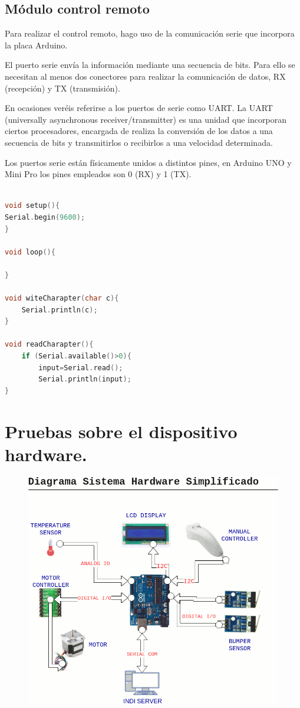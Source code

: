 \subsection{Módulo control remoto}

Para realizar el control remoto, hago uso de la comunicación serie que incorpora la placa Arduino.


El puerto serie envía la información mediante una secuencia de bits. Para ello se necesitan al menos dos conectores para realizar la comunicación de datos, RX (recepción) y TX (transmisión). 

En ocasiones veréis referirse a los puertos de serie como UART. La UART (universally asynchronous receiver/transmitter) es una unidad que incorporan ciertos procesadores, encargada de realiza la conversión de los datos a una secuencia de bits y transmitirlos o recibirlos a una velocidad determinada.

Los puertos serie están físicamente unidos a distintos pines, en Arduino UNO y Mini Pro los pines empleados son 0 (RX) y 1 (TX).


\begin{lstlisting}[language=C, caption={Ejemplo lectura y escritura puerto serie},label={lst:write_read_serial_port_sample}]

void setup(){
Serial.begin(9600);
}

void loop(){

}

void witeCharapter(char c){
	Serial.println(c);
}

void readCharapter(){
	if (Serial.available()>0){
		input=Serial.read();
		Serial.println(input);
}


\end{lstlisting}




\section{Pruebas sobre el dispositivo hardware.}

\begin{figure}[h]
	\centering
	\includegraphics[width=0.7\linewidth]{../images/diagramaHardware}
	\caption{}
	\label{fig:diagramaHardware}
\end{figure}

